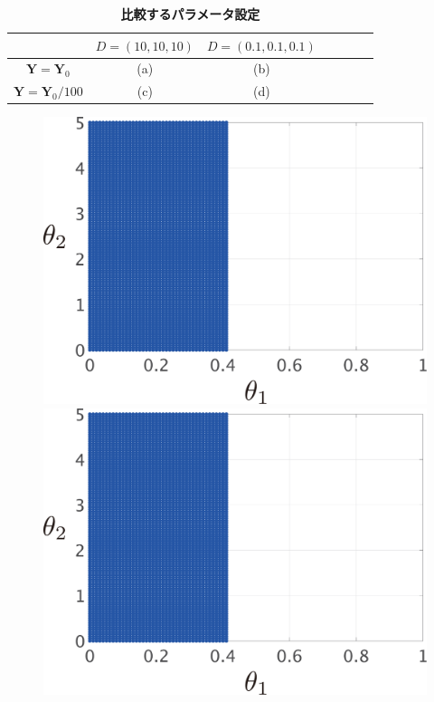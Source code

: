 \documentclass[tombow,dvipdfmx]{corona-a5-1.1}
\begin{document}
\begin{table}[h]
\medskip
 \caption{\textbf{ 比較するパラメータ設定}}
 \label{table:parasetcom}
 \centering
  \begin{tabular}{|c|c|c|c|c|c|c|}
   \hline
 &    $D=(10,10,10)$ &   $D=(0.1,0.1,0.1)$ \\
   \hline 
 $\bm{Y} =\bm{Y}_0$ & (a) & (b) \\
   \hline
 $\bm{Y} = \bm{Y}_0/100  $  & (c) & (d) \\
   \hline
  \end{tabular}
\end{table}

\begin{figure}[t!]
  \centering
  {
  \begin{minipage}{0.49\linewidth}
    \centering
    \includegraphics[width = 0.90\linewidth]{figs/Y1D1}
    \medskip
  \end{minipage}
  \begin{minipage}{0.49\linewidth}
    \centering
    \includegraphics[width = 0.90\linewidth]{figs/Y1D0.01}

\end{minipage}}
\end{figure}
\end{document}
